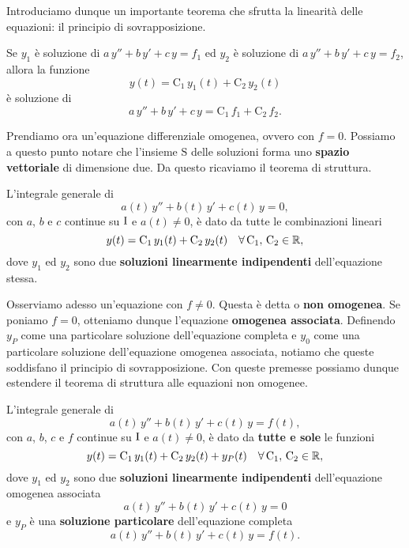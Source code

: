 \documentclass[../../analisi2]{subfiles}
\begin{document}
        Introduciamo dunque un importante teorema che sfrutta la linearità delle equazioni: il principio di sovrapposizione.

        \begin{teorema}
            Se \(y_1\) è soluzione di \(a \, y'' + b \, y' + c \, y = f_1\) ed \(y_2\) è soluzione di
            \(a \, y'' + b \, y' + c \, y = f_2\), allora la funzione
            \[
                y(t) = \mathrm{C_1} \, y_1(t) + \mathrm{C_2} \, y_2(t)
            \]
            è soluzione di
            \[
                a \, y'' + b \, y' + c \, y = \mathrm{C_1} \, f_1 + \mathrm{C_2} \, f_2.
            \]
        \end{teorema}

        Prendiamo ora un'equazione differenziale omogenea, ovvero con \(f = 0\). Possiamo a questo punto notare che l'insieme
        \(\mathrm{S}\) delle soluzioni forma uno \textbf{spazio vettoriale} di dimensione due. Da questo ricaviamo il teorema di
        struttura.

        \begin{teorema}
            L'integrale generale di
            \[
                a(t) \, y'' + b(t) \, y' + c(t) \, y = 0,
            \]
            con \(a\), \(b\) e \(c\) continue su \(\mathrm{I}\) e \(a(t) \neq 0\), è dato da tutte le combinazioni lineari
            \[
                y(t) = \mathrm{C_1} \, y_1(t) + \mathrm{C_2} \, y_2(t) \quad \forall \, \mathrm{C_1}, \, \mathrm{C_2} \in \mathbb{R},
            \]
            dove \(y_1\) ed \(y_2\) sono due \textbf{soluzioni linearmente indipendenti} dell'equazione stessa.
        \end{teorema}

        Osserviamo adesso un'equazione con \(f \neq 0\). Questa è detta  o \textbf{non omogenea}. Se poniamo \(f = 0\),
        otteniamo dunque l'equazione \textbf{omogenea associata}. Definendo \(y_P\) come una particolare soluzione dell'equazione
        completa e \(y_0\) come una particolare soluzione dell'equazione omogenea associata, notiamo che queste soddisfano il
        principio di sovrapposizione. Con queste premesse possiamo dunque estendere il teorema di struttura alle equazioni non
        omogenee.

        \begin{teorema}
            L'integrale generale di
            \[
                a(t) \, y'' + b(t) \, y' + c(t) \, y = f(t),
            \]
            con \(a\), \(b\), \(c\) e \(f\) continue su \(\mathrm{I}\) e \(a(t) \neq 0\), è dato da \textbf{tutte e sole} le funzioni
            \[
                y(t) = \mathrm{C_1} \, y_1(t) + \mathrm{C_2} \, y_2(t) + y_P(t) \quad \forall \, \mathrm{C_1}, \, \mathrm{C_2} \in \mathbb{R},
            \]
            dove \(y_1\) ed \(y_2\) sono due \textbf{soluzioni linearmente indipendenti} dell'equazione omogenea associata
            \[
                a(t) \, y'' + b(t) \, y' + c(t) \, y = 0
            \]
            e \(y_P\) è una \textbf{soluzione particolare} dell'equazione completa
            \[
                a(t) \, y'' + b(t) \, y' + c(t) \, y = f(t).
            \]
        \end{teorema}
            
\end{document}
